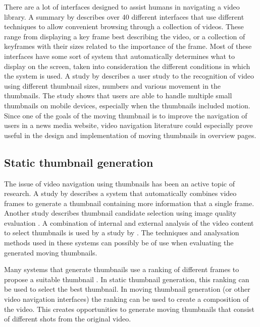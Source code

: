 \documentclass{../resources/sig-alternate-05-2015}
\begin{document}
There are a lot of interfaces designed to assist humans in navigating a video library. A summary by \textcite{Schoeffmann:2010iw} describes over 40 different interfaces that use different techniques to allow convenient browsing through a collection of videos. These range from displaying a key frame best describing the video, or a collection of keyframes with their sizes related to the importance of the frame. Most of these interfaces have some sort of system that automatically determines what to display on the screen, taken into consideration the different conditions in which the system is used. A study by \textcite{Hurst:2011jx} describes a user study to the recognition of video using different thumbnail sizes, numbers and various movement in the thumbnails. The study shows that users are able to handle multiple small thumbnails on mobile devices, especially when the thumbnails included motion. Since one of the goals of the moving thumbnail is to improve the navigation of users in a news media website, video navigation literature could especially prove useful in the design and implementation of moving thumbnails in overview pages.

\subsection{Static thumbnail generation}
\label{static thumbnails}
The issue of video navigation using thumbnails has been an active topic of research. A \citeyear{Kim:2015co} study by \textcite{Kim:2015co} describes a system that automatically combines video frames to generate a thumbnail containing more information that a single frame. Another study describes thumbnail candidate selection using image quality evaluation \cite{Zhang:2014jg}. A combination of internal and external analysis of the video content to select thumbnails is used by a study by \textcite{Liu:2015ux}. The techniques and analysation methods used in these systems can possibly be of use when evaluating the generated moving thumbnails.

Many systems that generate thumbnails use a ranking of different frames to propose a suitable thumbnail \cite{Choi:2015gm,Zhang:2012eo,Gao:2009dx}. In static thumbnail generation, this ranking can be used to select the best thumbnail. In moving thumbnail generation (or other video navigation interfaces) the ranking can be used to create a composition of the video. This creates opportunities to generate moving thumbnails that consist of different shots from the original video.
\end{document}
